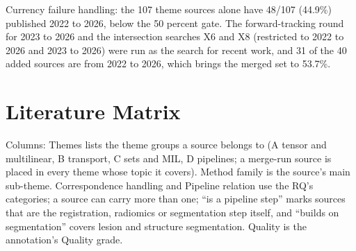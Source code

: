 \documentclass[journal,onecolumn]{IEEEtran}
\begin{document}
Currency failure handling: the 107 theme sources alone have 48/107 (44.9\%) published 2022 to 2026, below the 50 percent gate. The forward-tracking round for 2023 to 2026 and the intersection searches X6 and X8 (restricted to 2022 to 2026 and 2023 to 2026) were run as the search for recent work, and 31 of the 40 added sources are from 2022 to 2026, which brings the merged set to 53.7\%.

\appendices

\section{Literature Matrix}

Columns: Themes lists the theme groups a source belongs to (A tensor and multilinear, B transport, C sets and MIL, D pipelines; a merge-run source is placed in every theme whose topic it covers). Method family is the source's main sub-theme. Correspondence handling and Pipeline relation use the RQ's categories; a source can carry more than one; ``is a pipeline step'' marks sources that are the registration, radiomics or segmentation step itself, and ``builds on segmentation'' covers lesion and structure segmentation. Quality is the annotation's Quality grade.
\end{document}
